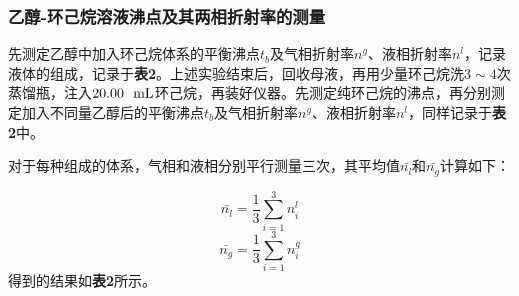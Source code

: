 \documentclass[12pt]{article}
\begin{document}
	 		\subsubsection{乙醇-环己烷溶液沸点及其两相折射率的测量}
			先测定乙醇中加入环己烷体系的平衡沸点$t_{b}$及气相折射率$n^{g}$、液相折射率$n^{l}$，记录液体的组成，记录于\textbf{表2}。上述实验结束后，回收母液，再用少量环己烷洗$3\sim 4$次蒸馏瓶，注入$20.00\ \ {\rm mL}$环己烷，再装好仪器。先测定纯环己烷的沸点，再分别测定加入不同量乙醇后的平衡沸点$t_{b}$及气相折射率$n^{g}$、液相折射率$n^{l}$，同样记录于\textbf{表2}中。\par
			对于每种组成的体系，气相和液相分别平行测量三次，其平均值$\bar{n_{l}}$和$\bar{n_{g}}$计算如下：\par
			$$
			\bar{n_{l}}=\frac{1}{3}\sum_{i=1}^{3}n^{l}_{i}
			$$
			$$
			\bar{n_{g}}=\frac{1}{3}\sum_{i=1}^{3}n^{g}_{i}
			$$
			得到的结果如\textbf{表2}所示。\par
\end{document}
